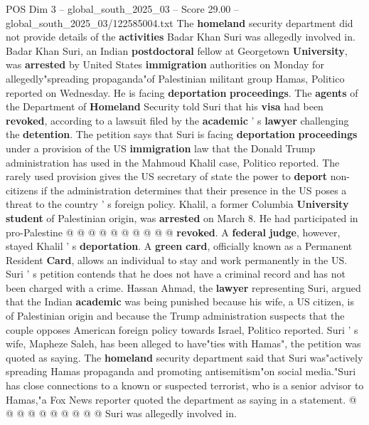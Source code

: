 \begin{textsample}{POS Dim 3 – global\_south\_2025\_03 – Score 29.00 – global\_south\_2025\_03/122585004.txt}  \label{ex:f3_pos_035}
The \textbf{homeland} security department did not provide details of the \textbf{activities} Badar Khan Suri was allegedly involved in.
Badar Khan Suri, an Indian \textbf{postdoctoral} fellow at Georgetown \textbf{University}, was \textbf{arrested} by United States \textbf{immigration} authorities on Monday for allegedly"spreading propaganda"of Palestinian militant group Hamas, Politico reported on Wednesday.
He is facing \textbf{deportation} \textbf{proceedings}.
The \textbf{agents} of the Department of \textbf{Homeland} Security told Suri that his \textbf{visa} had been \textbf{revoked}, according to a lawsuit filed by the \textbf{academic} ' s \textbf{lawyer} challenging the \textbf{detention}.
The petition says that Suri is facing \textbf{deportation} \textbf{proceedings} under a provision of the US \textbf{immigration} law that the Donald Trump administration has used in the Mahmoud Khalil case, Politico reported.
The rarely used provision gives the US secretary of state the power to \textbf{deport} non-citizens if the administration determines that their presence in the US poses a threat to the country ' s foreign policy.
Khalil, a former Columbia \textbf{University} \textbf{student} of Palestinian origin, was \textbf{arrested} on March 8.
He had participated in pro-Palestine @ @ @ @ @ @ @ @ @ @ \textbf{revoked}.
A \textbf{federal} \textbf{judge}, however, stayed Khalil ' s \textbf{deportation}.
A \textbf{green} \textbf{card}, officially known as a Permanent Resident \textbf{Card}, allows an individual to stay and work permanently in the US.
Suri ' s petition contends that he does not have a criminal record and has not been charged with a crime.
Hassan Ahmad, the \textbf{lawyer} representing Suri, argued that the Indian \textbf{academic} was being punished because his wife, a US citizen, is of Palestinian origin and because the Trump administration suspects that the couple opposes American foreign policy towards Israel, Politico reported.
Suri ' s wife, Mapheze Saleh, has been alleged to have"ties with Hamas", the petition was quoted as saying.
The \textbf{homeland} security department said that Suri was"actively spreading Hamas propaganda and promoting antisemitism"on social media."Suri has close connections to a known or suspected terrorist, who is a senior advisor to Hamas,"a Fox News reporter quoted the department as saying in a statement. @ @ @ @ @ @ @ @ @ @ Suri was allegedly involved in.

\end{textsample}
